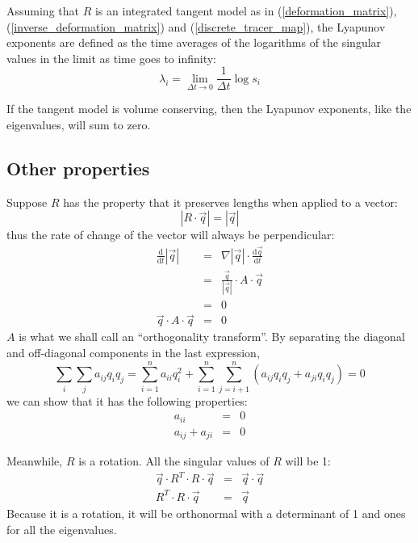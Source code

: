 \documentclass[12pt]{article}
\begin{document}
Assuming that $R$ is an integrated tangent model as in 
(\ref{deformation_matrix}), (\ref{inverse_deformation_matrix})
and (\ref{discrete_tracer_map}), 
the Lyapunov exponents are defined as the time averages of the logarithms
of the singular values in the limit as time goes to infinity:
\begin{equation}
\lambda_i=\lim_{\Delta t \rightarrow 0} \frac{1}{\Delta t} \log s_i
\end{equation}

If the tangent model is volume conserving, then the Lyapunov exponents, like
the eigenvalues, will sum to zero.

\subsection{Other properties}

Suppose $R$ has the property that it preserves lengths when applied to
a vector:
\begin{equation}
|R\cdot \vec q| = |\vec q|
\label{length_preservation}
\end{equation}
thus the rate of change of the vector will always be perpendicular:
\begin{eqnarray}
\frac{\mathrm d}{\mathrm d t}|\vec q| & = & 
	\nabla |\vec q| \cdot \frac{\mathrm d \vec q}{\mathrm d t} \\
	&=& \frac{\vec q}{|\vec q|} \cdot A \cdot \vec q \\
	&=& 0 \\
	\vec q \cdot A \cdot \vec q & = & 0 
\end{eqnarray}
$A$ is what we shall call an ``orthogonality transform''.
By separating the diagonal and off-diagonal components in the last expression,
\begin{equation}
\sum_i \sum_j a_{ij} q_i q_j = \sum_{i=1}^n a_{ii}q_i^2 + \sum_{i=1}^n \sum_{j=i+1}^n (a_{ij} q_i q_j + a_{ji} q_i q_j) = 0
\end{equation}
we can show that it has the following
properties:
\begin{eqnarray}
a_{ii} & = & 0 \\
a_{ij}+a_{ji} & = & 0
\end{eqnarray}

Meanwhile, $R$ is a rotation.  All the singular values of $R$ will be 1:
\begin{eqnarray}
\vec q \cdot R^T \cdot R \cdot \vec q & = & \vec q \cdot \vec q\\
R^T \cdot R \cdot \vec q & = & \vec q
\end{eqnarray}
Because it is a rotation, it will be orthonormal with a determinant of 1
and ones for all the eigenvalues.
\end{document}
